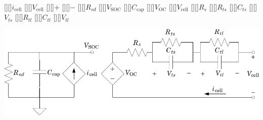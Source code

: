 [][]{$i_\text{cell}$}
[][]{$V_\text{cell}$}
\psfrag{+}[][]{$+$}
\psfrag{-}[][]{$-$}
[][]{$R_{sd}$}
[][]{$V_\text{SOC}$}
[][]{$C_\text{cap}$}
[][]{$V_\text{OC}$}
[][]{$V_\text{cell}$}
[][]{$R_s$}
[][]{$R_{ts}$}
[][]{$C_{ts}$}
[][]{$V_{ts}$}
[][]{$R_{tl}$}
[][]{$C_{tl}$}
[][]{$V_{tl}$}

\centering
\includegraphics[width=\columnwidth]{batt_model}